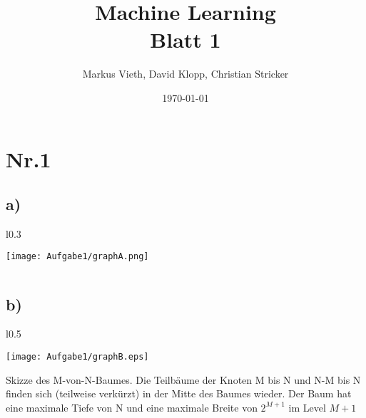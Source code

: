 \documentclass[a4paper,11pt,twoside]{article}
\title{Machine Learning\\ Blatt 1}
\author{Markus Vieth, David Klopp, Christian Stricker}
\date{\today}
\begin{document}
\maketitle
\cleardoublepage
\pagestyle{myheadings}

\section*{Nr.1}

\subsection*{a)}
\begin{wrapfigure}[18]{l}{0.3\linewidth}
	\begin{center}
		\vspace*{-3em}
		\texttt{[image: Aufgabe1/graphA.png]}
	\end{center}
\end{wrapfigure}
$~$\\
$~$\\
$~$\\
$~$\\
$~$\\
$~$\\
$~$\\
$~$\\
$~$\\
$~$\\
$~$\\
$~$\\
$~$\\
$~$\\
$~$\\
$~$\\
$~$\\
$~$\\
$~$\\
$~$\\
\subsection*{b)}
\begin{wrapfigure}[5]{l}{0.5\textwidth}
	\begin{center}
		
		\vspace*{-3em}
\texttt{[image: Aufgabe1/graphB.eps]}
\end{center}
\end{wrapfigure}
Skizze des M-von-N-Baumes. Die Teilbäume der Knoten M bis N und N-M bis N finden sich (teilweise verkürzt) in der Mitte des Baumes wieder. Der Baum hat eine maximale Tiefe von N und eine maximale Breite von $2^{M+1}$ im Level $M+1$
\end{document}
